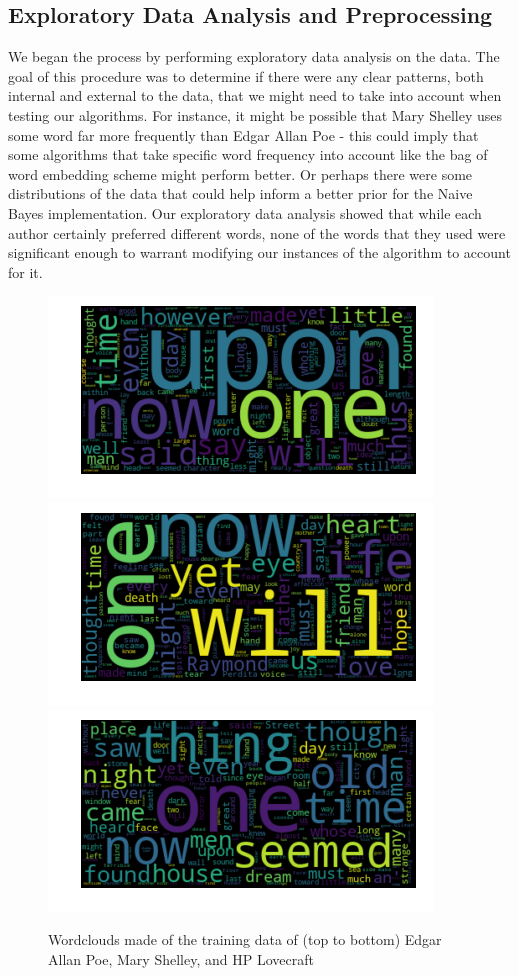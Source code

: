 \documentclass{article}
\begin{document}
\subsection{Exploratory Data Analysis and Preprocessing}
We began the process by performing exploratory data analysis on the data. The goal of this procedure was to determine if there were any clear patterns, both internal and external to the data, that we might need to take into account when testing our algorithms. For instance, it might be possible that Mary Shelley uses some word far more frequently than Edgar Allan Poe - this could imply that some algorithms that take specific word frequency into account like the bag of word embedding scheme might perform better. Or perhaps there were some distributions of the data that could help inform a better prior for the Naive Bayes implementation. Our exploratory data analysis showed that while each author certainly preferred different words, none of the words that they used were significant enough to warrant modifying our instances of the algorithm to account for it. 
\begin{figure}[!ht]
    \centering
    \includegraphics[scale = .5]{eap.png}
    \includegraphics[scale = .5]{mws.png}
    \includegraphics[scale = .5]{hpl.png}
    \caption{Wordclouds made of the training data of (top to bottom) Edgar Allan Poe, Mary Shelley, and HP Lovecraft}
    \label{fig:word_clouds_eda}
\end{figure}
\end{document}
